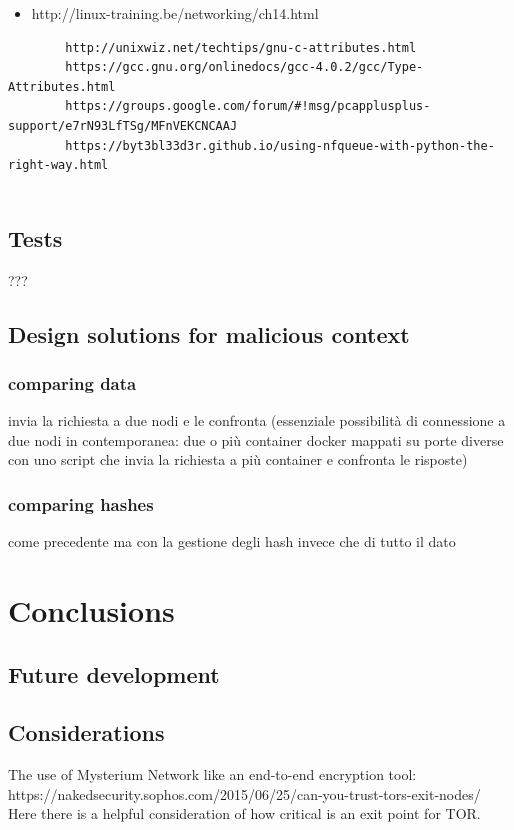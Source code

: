 \documentclass[12pt]{article}
\begin{document}
	
	\begin{itemize}
		\item http://linux-training.be/networking/ch14.html
	\end{itemize}

	\begin{verbatim}
		http://unixwiz.net/techtips/gnu-c-attributes.html
		https://gcc.gnu.org/onlinedocs/gcc-4.0.2/gcc/Type-Attributes.html
		https://groups.google.com/forum/#!msg/pcapplusplus-support/e7rN93LfTSg/MFnVEKCNCAAJ
		https://byt3bl33d3r.github.io/using-nfqueue-with-python-the-right-way.html
		
	\end{verbatim}
			
	\subsection{Tests}
		???
	\subsection{Design solutions for malicious context}
		\subsubsection{comparing data}
		invia la richiesta a due nodi e le confronta (essenziale possibilità di connessione a due nodi in contemporanea: due o più container docker mappati su porte diverse con uno script che invia la richiesta a più container e confronta le risposte)

		\subsubsection{comparing hashes}
		come precedente ma con la gestione degli hash invece che di tutto il dato
		
\section{Conclusions}
	\subsection{Future development}
	\subsection{Considerations}

	The use of Mysterium Network like an end-to-end encryption tool: https://nakedsecurity.sophos.com/2015/06/25/can-you-trust-tors-exit-nodes/
	Here there is a helpful consideration of how critical is an exit point for TOR.
\end{document}
